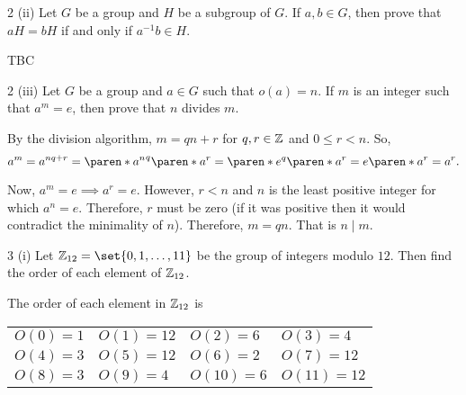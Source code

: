 \documentclass[11pt]{penrose}
\begin{document}
\begin{problem}{2 (ii)}
    Let $G$ be a group and $H$ be a subgroup of $G$. If $a, b \in G$, then prove that $aH = bH$ if and only if $a^{-1} b \in H$.

    TBC




\end{problem}

\begin{problem}{2 (iii)}
    Let $G$ be a group and $a \in G$ such that $o(a) = n$. If $m$ is an integer such that $a^m = e$, then prove that $n$ divides $m$.

    \solution By the division algorithm, $m = qn + r$ for $q, r \in \mathbb{Z}$ and $0 \leq r < n$. So,
    \begin{equation*}
        a^m = a^{nq + r} = \paren*{{a^n}^q} \paren*{a^r} = \paren*{e^q} \paren*{a^r} = e \paren*{a^r} = a^r.
    \end{equation*}

    Now, $a^m = e \implies a^r = e$. However, $r < n$ and $n$ is the least positive integer for which $a^n = e$. Therefore, $r$ must be zero (if it was positive then it would contradict the minimality of $n$). Therefore, $m = qn$. That is $n \mid m$.
\end{problem}

\begin{problem}{3 (i)}
    Let $\Z_{12} = \set{0, 1, \dots, 11}$ be the group of integers modulo $12$. Then find the order of each element of $\mathbb{Z}_{12}$.

    \solution The order of each element in $\mathbb{Z}_{12}$ is
    \begin{center}
    \begin{tabularx}{0.8\textwidth}{XXXX}
        $O(0)  =  1$ & $O(1)  = 12$ & $O(2)  =  6$ & $O(3)  =  4$\\
        $O(4)  =  3$ & $O(5)  = 12$ & $O(6)  =  2$ & $O(7)  = 12$\\
        $O(8)  =  3$ & $O(9)  =  4$ & $O(10) =  6$ & $O(11) = 12$\\
    \end{tabularx}
    \end{center}
\end{problem}
\end{document}
